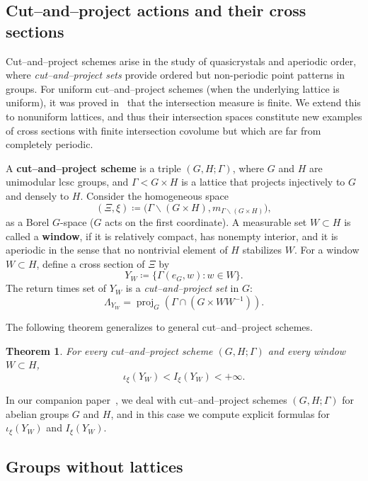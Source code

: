 \documentclass{amsart}
\numberwithin{equation}{subsection}
\newtheorem{mainthm}{Theorem}
\theoremstyle{remark}
\begin{document}
\subsection{Cut--and--project actions and their cross sections}

Cut--and--project schemes arise in the study of quasicrystals and aperiodic order, where \emph{cut--and--project sets} provide ordered but non-periodic point patterns in groups. For uniform cut--and--project schemes (when the underlying lattice is uniform), it was proved in~\cite[Theorem~1.4]{bjorklund2025int} that the intersection measure is finite. We extend this to nonuniform lattices, and thus their intersection spaces constitute new examples of cross sections with finite intersection covolume but which are far from completely periodic.

A {\bf cut--and--project scheme} is a triple \(\left(G,H;\Gamma\right)\), where \(G\) and \(H\) are unimodular lcsc groups, and
\(\Gamma<G\times H\) is a lattice that projects injectively to \(G\) and densely to \(H\). Consider the homogeneous space
\[(\Xi,\xi)\coloneqq\bigl(\Gamma\backslash\left(G\times H\right),m_{\Gamma\backslash\left(G\times H\right)}\bigr),\]
as a Borel \(G\)-space (\(G\) acts on the first coordinate). A measurable set \(W\subset H\) is called a {\bf window}, if it is relatively compact, has nonempty interior, and it is aperiodic in the sense that no nontrivial element of \(H\) stabilizes \(W\). For a window \(W\subset H\), define a cross section of \(\Xi\) by
\[Y_{W}\coloneqq\{\Gamma\left(e_{G},w\right):w\in W\}.\]
The return times set of \(Y_{W}\) is a \emph{cut--and--project set} in \(G\):
\[\Lambda_{Y_{W}}=\operatorname{proj}_{G}\left(\Gamma\cap\left(G\times WW^{-1}\right)\right).\]

The following theorem generalizes
\cite[Theorem~1.4]{bjorklund2025int} to general cut--and--project schemes.

\begin{mainthm}\label{mthm:finintcov}
For every cut--and--project scheme \((G,H;\Gamma)\) and every window \(W\subset H\),
\[\iota_{\xi}\left(Y_{W}\right)<I_{\xi}\left(Y_{W}\right)<+\infty.\]
\end{mainthm}

In our companion paper~\cite{AvBjCuII}, we deal with cut--and--project schemes \(\left(G,H;\Gamma\right)\) for abelian groups \(G\) and \(H\), and in this case we compute explicit formulas for \(\iota_{\xi}\left(Y_{W}\right)\) and \(I_{\xi}\left(Y_{W}\right)\).

\subsection{Groups without lattices}
\end{document}
